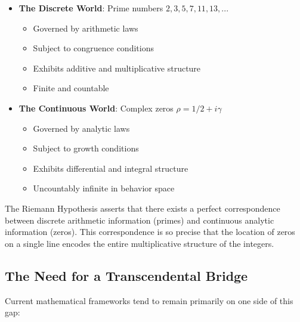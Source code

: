 \begin{itemize}
\item \textbf{The Discrete World}: Prime numbers $2, 3, 5, 7, 11, 13, ...$
  \begin{itemize}
  \item Governed by arithmetic laws
  \item Subject to congruence conditions  
  \item Exhibits additive and multiplicative structure
  \item Finite and countable
  \end{itemize}

\item \textbf{The Continuous World}: Complex zeros $\rho = 1/2 + i\gamma$
  \begin{itemize}
  \item Governed by analytic laws
  \item Subject to growth conditions
  \item Exhibits differential and integral structure
  \item Uncountably infinite in behavior space
  \end{itemize}
\end{itemize}

\begin{insight}
The Riemann Hypothesis asserts that there exists a perfect correspondence between discrete arithmetic information (primes) and continuous analytic information (zeros). This correspondence is so precise that the location of zeros on a single line encodes the entire multiplicative structure of the integers.
\end{insight}

\subsection{The Need for a Transcendental Bridge}
\label{subsec:transcendental_bridge}

Current mathematical frameworks tend to remain primarily on one side of this gap:

